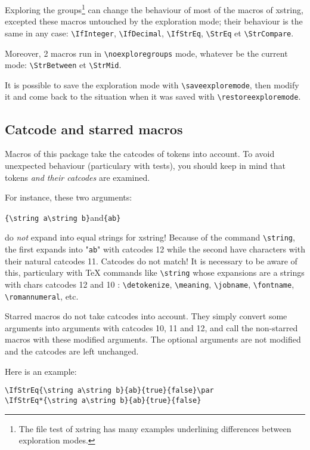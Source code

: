 \documentclass[a4paper,10pt]{article}
\newcommand\Xstring{\textsf{xstring}\xspace}
\newcommand\styleexercice{\footnotesize}
\newcommand\verbinline{\lstinline[basicstyle=\normalsize\ttfamily]}
\begin{document}
Exploring the groups\footnote{The file test of \Xstring has many examples underlining differences between exploration modes.} can change the behaviour of most of the macros of \Xstring, excepted these macros untouched by the exploration mode; their behaviour is the same in any case: \verbinline|\IfInteger|, \verbinline|\IfDecimal|, \verbinline|\IfStrEq|, \verbinline|\StrEq| et \verbinline|\StrCompare|.

Moreover, 2 macros run in \verbinline|\noexploregroups| mode, whatever be the current mode: \verbinline|\StrBetween| et \verbinline|\StrMid|.\medskip

It is possible to save the exploration mode with \verbinline|\saveexploremode|, then modify it and come back to the situation when it was saved with \verbinline|\restoreexploremode|.

\subsection{Catcode and starred macros}
\label{macrosetoilees}
Macros of this package take the catcodes of tokens into account. To avoid unexpected behaviour (particulary with tests), you should keep in mind that tokens \emph{and their catcodes} are examined.\medskip

For instance, these two arguments:\par\medskip
\hfil\verbinline|{\string a\string b}|\qquad and\qquad\verb|{ab}|\hfil{}\par\smallskip
do \emph{not} expand into equal strings for xstring! Because of the command \verbinline|\string|, the first expands into "\verb|ab|" with catcodes 12 while the second have characters with their natural catcodes 11. Catcodes do not match! It is necessary to be aware of this, particulary with \TeX{} commands like \verbinline|\string| whose expansions are a strings with chars catcodes 12 and 10 : \verbinline|\detokenize|, \verbinline|\meaning|, \verbinline|\jobname|, \verbinline|\fontname|, \verbinline|\romannumeral|, etc.\medskip

Starred macros do not take catcodes into account. They simply convert some arguments into arguments with catcodes 10, 11 and 12, and call the non-starred macros with these modified arguments. The optional arguments are not modified and the catcodes are left unchanged.\medskip

Here is an example:\par\nobreak\smallskip
\begin{minipage}[c]{0.65\linewidth}
\begin{lstlisting}
\IfStrEq{\string a\string b}{ab}{true}{false}\par
\IfStrEq*{\string a\string b}{ab}{true}{false}
\end{lstlisting}%
\end{minipage}\hfill
\begin{minipage}[c]{0.35\linewidth}
	\styleexercice
	\par
\end{minipage}%
\smallskip
\end{document}
